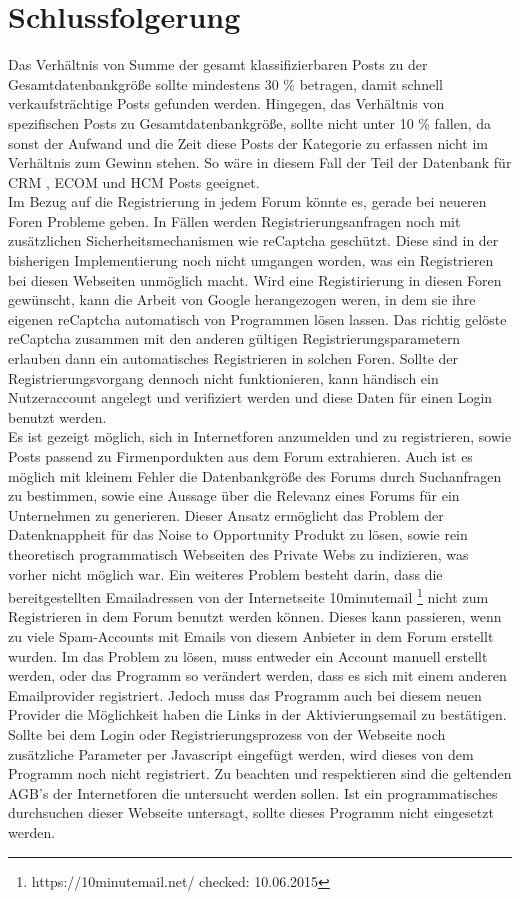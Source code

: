 \section{Schlussfolgerung}
Das Verhältnis von Summe der gesamt klassifizierbaren Posts zu der Gesamtdatenbankgröße sollte mindestens 30 \% betragen, damit schnell verkaufsträchtige Posts gefunden werden. Hingegen, das Verhältnis von spezifischen Posts zu Gesamtdatenbankgröße, sollte nicht unter 10 \% fallen, da sonst der Aufwand und die Zeit diese Posts der Kategorie zu erfassen nicht im Verhältnis zum Gewinn stehen. So wäre in diesem Fall der Teil der Datenbank für CRM , ECOM und HCM Posts geeignet.\\
Im Bezug auf die Registrierung in jedem Forum könnte es, gerade bei neueren Foren Probleme geben. In Fällen werden Registrierungsanfragen noch mit zusätzlichen Sicherheitsmechanismen wie reCaptcha geschützt. Diese sind in der bisherigen Implementierung noch nicht umgangen worden, was ein Registrieren bei diesen Webseiten unmöglich macht. Wird eine Registirierung in diesen Foren gewünscht, kann die Arbeit von Google herangezogen weren, in dem sie ihre eigenen reCaptcha automatisch von Programmen lösen lassen. Das richtig gelöste reCaptcha zusammen mit den anderen gültigen Registrierungsparametern erlauben dann ein automatisches Registrieren in solchen Foren. Sollte der Registrierungsvorgang dennoch nicht funktionieren, kann händisch ein Nutzeraccount angelegt und verifiziert werden und diese Daten für einen Login benutzt werden.\\
Es ist gezeigt möglich, sich in Internetforen anzumelden und zu registrieren, sowie Posts passend zu Firmenpordukten aus dem Forum extrahieren.
Auch ist es möglich mit kleinem Fehler die Datenbankgröße des Forums durch Suchanfragen zu bestimmen, sowie eine Aussage über die Relevanz eines Forums für ein Unternehmen zu generieren. Dieser Ansatz ermöglicht das Problem der Datenknappheit für das Noise to Opportunity Produkt zu lösen, sowie rein theoretisch programmatisch Webseiten des Private Webs zu indizieren, was vorher nicht möglich war. Ein weiteres Problem besteht darin, dass die bereitgestellten Emailadressen von der Internetseite 10minutemail \footnote{https://10minutemail.net/ checked: 10.06.2015} nicht zum Registrieren in dem Forum benutzt werden können. Dieses kann passieren, wenn zu viele Spam-Accounts mit Emails von diesem Anbieter in dem Forum erstellt wurden. Im das Problem zu lösen, muss entweder ein Account manuell erstellt werden, oder das Programm so verändert werden, dass es sich mit einem anderen Emailprovider registriert. Jedoch muss das Programm auch bei diesem neuen Provider die Möglichkeit haben die Links in der Aktivierungsemail zu bestätigen.
Sollte bei dem Login oder Registrierungsprozess von der Webseite noch zusätzliche Parameter per Javascript eingefügt werden, wird dieses von dem Programm noch nicht registriert.
Zu beachten und respektieren sind die geltenden AGB's der Internetforen die untersucht werden sollen. Ist ein programmatisches durchsuchen dieser Webseite untersagt, sollte dieses Programm nicht eingesetzt werden.
